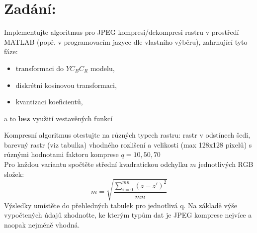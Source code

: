 \section{Zadání:}

Implementujte algoritmus pro JPEG kompresi/dekompresi rastru v prostředí MATLAB (popř. v programovacím jazyce dle vlastního výběru), zahrnující tyto fáze:
\begin{itemize}
    \item transformaci do $YC_BC_R$ modelu,
    \item diskrétní kosinovou transformaci,
    \item kvantizaci koeficientů,
\end{itemize}
a to \textbf{bez} využití vestavěných funkcí

Kompresní algoritmus otestujte na různých typech rastru: rastr v odstínech šedi, barevný rastr (viz tabulka) vhodného rozlišení a velikosti (max 128x128 pixelů) s různými hodnotami faktoru komprese $q = 10,50,70$\\
Pro každou variantu spočtěte střední kvadratickou odchylku $m$ jednotlivých RGB složek:
$$m=\sqrt{\frac{\sum_{i=0}^{mn}(z-z')^2}{mn}}$$
Výsledky umístěte do přehledných tabulek pro jednotlivá q. Na základě výše vypočtených údajů zhodnoťte, ke kterým typům dat je JPEG komprese nejvíce a naopak nejméně vhodná.